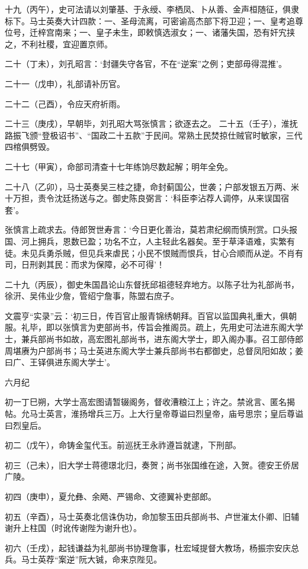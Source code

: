 \documentclass[]{article}
\begin{document}
十九（丙午），史可法请以刘肇基、于永绶、李栖凤、卜从善、金声桓随征，俱隶标下。马士英奏大计四款：一、圣母流离，可密谕高杰部下将卫迎；一、皇考追尊位号，迁梓宫南来；一、皇子未生，即敕慎选淑女；一、诸藩失国，恐有奸宄挟之，不利社稷，宜迎置京师。

二十（丁未），刘孔昭言：`封疆失守各官，不在``逆案''之例；吏部毋得混推'。

二十一（戊申），礼部请补历官。

二十二（己酉），令应天府祈雨。

二十三（庚戌），早朝毕，刘孔昭大骂张慎言；欲逐去之。
二十五（壬子），淮抚路振飞颁``登极诏书''、``国政二十五款''于民间。常熟土民焚掠仕贼官时敏家，三代四棺俱劈毁。

二十七（甲寅），命部司清查十七年练饷尽数起解；明年全免。

二十八（乙卯），马士英奏吴三桂之捷，命封蓟国公，世袭；户部发银五万两、米十万担，责令沈廷扬送与之。御史陈良弼言：`科臣李沾荐人调停，从来误国宿套'。

张慎言上疏求去。侍郎贺世寿言：`今日更化善治，莫若肃纪纲而慎刑赏。口头报国、河上拥兵，恩数已盈；功名不立，人主轻此名器矣。至于草泽语难，实繁有徒。未见兵勇杀贼，但见兵来虐民；小民不恨贼而恨兵，甘心合顺而从逆。不肖有司，日刑剥其民：而求为保障，必不可得'！

二十九（丙辰），御史朱国昌论山东督抚邱祖德轻弃地方。以陈子壮为礼部尚书，徐汧、吴伟业少詹，管绍宁詹事，陈盟右庶子。

文震亨``实录''云：`初三日，传百官止服青锦绣朝拜。百官以监国典礼重大，俱朝服。礼毕，即以张慎言为吏部尚书，传旨会推阁员。疏上，先用史可法进东阁大学士，兼兵部尚书如故，高宏图礼部尚书，进东阁大学士，即入阁办事。召工部侍郎周堪赓为户部尚书；马士英进东阁大学士兼兵部尚书右都御史，总督凤阳如故；姜曰广、王铎俱进东阁大学士'。

六月纪

初一丁巳朔，大学士高宏图请暂辍阁务，督收漕粮江上；许之。禁讹言、匿名揭帖。允马士英言，淮扬增兵三万。上大行皇帝尊谥曰烈皇帝，庙号思宗；皇后尊谥曰烈皇后。

初二（戊午），命铸金玺代玉。前巡抚王永祚遵旨就逮，下刑部。

初三（己未），旧大学士蒋德璟北归，奏贺；尚书张国维在途，入贺。德安王侨居广陵。

初四（庚申），夏允彝、余飏、严锡命、文德翼补吏部郎。

初五（辛酉），马士英奏北信诛伪功，命加黎玉田兵部尚书、卢世漼太仆卿、旧辅谢升上柱国（时讹传谢陛为谢升也）。

初六（壬戌），起钱谦益为礼部尚书协理詹事，杜宏域提督大教场，杨振宗安庆总兵。马士英荐``案逆''阮大铖，命来京陛见。
\end{document}

